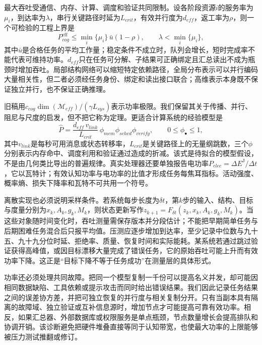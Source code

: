 最大吞吐受通信、内存、计算、调度和验证共同限制。设各阶段资源$i$的服务率为$\mu_i$，到达率为$\lambda$，串行关键路径时延为$L_{crit}$，有效并行度为$d_{eff}$，返工率为$\rho$，则一个可检验的工程上界是
\begin{equation}
P_{cog}^{\mathrm{eff}}\le \min_i\{\mu_i\}\,\bar u(1-\rho),\qquad \lambda<\min_i\{\mu_i\},
\end{equation}
其中$\bar u$是合格任务的平均工作量；稳定条件不成立时，队列会增长，短时完成率不能代表可维持功率。$d_{eff}$只在任务可分解、子结果可正确绑定且汇总读出不成为瓶颈时增加吞吐。局部结构网络可以缩短特定依赖路径，全局分布表示可以并行编码大量相关性，但二者必须经任务身份、绑定和读出接口联合；高维表示本身既不保证独立并行，也不保证正确推理。

旧稿用$c_{cog}\dim(\mathcal{M}_{eff})/(\gamma L_{sys})$表示功率极限。我们保留其关于传播、并行、阻尼与尺度的启发，但不把它称为定理。更适合计算系统的经验模型是
\begin{equation}
\widehat P=\frac{d_{eff}\,v_{link}}{L_{crit}}\,\phi_{mem}\phi_{sched}\phi_{verify},\qquad 0\le\phi_{\bullet}\le1,
\end{equation}
其中$v_{link}$是每秒可用消息或状态转移率，$L_{crit}$是关键路径上的无量纲跳数，三个$\phi$分别表示内存命中、调度利用和验证通过造成的折减。该式是待拟合的模型假设，不是由几何类比导出的普遍规律。真实处理器还要单独报告电功率$P_{elec}=\Delta E^{\mathrm{J}}/\Delta t$，它以瓦特计；有效认知功率与电功率的比值才形成任务每焦耳指标。活动强度、概率熵、损失下降率和瓦特不可共用一个符号。

离散实现也必须说明采样条件。若系统每步长度为$\delta t$，第$k$步的输入、结构、目标与度量分别为$x_k,A_k,g_k,M_k$，则状态更新写作$z_{k+1}=F_{\delta t}(z_k,x_k,A_k,g_k,M_k)$。当这些对象随时间变化时，吞吐测量需保存版本并分段估计；不能把早期简单任务与后期困难任务混合后只报平均值。压测应逐步增加到达率，至少记录中位数与九十五、九十九分位时延、拒绝率、质量、恢复时间和实际能耗。某系统若通过跳过验证获得高峰值，或因目标漂移大量完成了错误任务，它的原始吞吐可能上升而有效功率下降。这正是“目标下降不等于任务成功”在测量层的具体形式。

功率还必须处理共同故障。把同一个模型复制一千份可以提高名义并发，却可能因相同数据缺陷、工具依赖或提示攻击而同时给出错误结果。我们因此记录任务结果之间的误差协方差，并把可独立恢复的并行度与相关复制分开。只有当副本具有隔离的故障域、独立验证或互补信息源时，增加节点才可能提高可靠有效功率。相反，如果汇总器、外部数据库或权限服务是单点瓶颈，节点数量增长会提高排队和协调开销。该诊断避免把硬件堆叠直接等同于认知带宽，也使最大功率的上限能够被压力测试推翻或修订。

